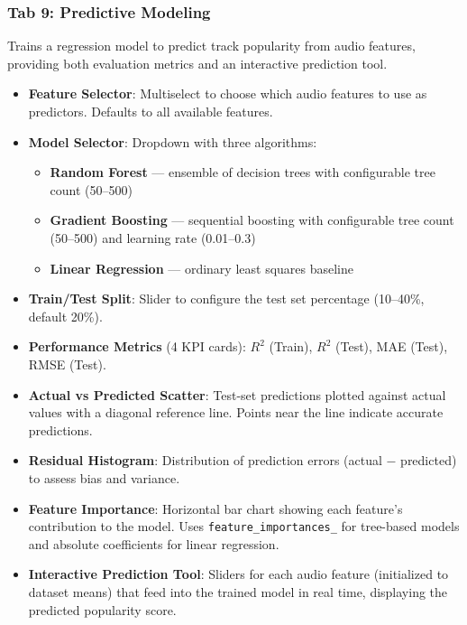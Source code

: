 \documentclass[12pt,a4paper]{article}
\begin{document}
\subsubsection{Tab 9: Predictive Modeling}

Trains a regression model to predict track popularity from audio features, providing both evaluation metrics and an interactive prediction tool.

\begin{itemize}[noitemsep]
    \item \textbf{Feature Selector}: Multiselect to choose which audio features to use as predictors. Defaults to all available features.
    \item \textbf{Model Selector}: Dropdown with three algorithms:
    \begin{itemize}[noitemsep]
        \item \textbf{Random Forest} --- ensemble of decision trees with configurable tree count (50--500)
        \item \textbf{Gradient Boosting} --- sequential boosting with configurable tree count (50--500) and learning rate (0.01--0.3)
        \item \textbf{Linear Regression} --- ordinary least squares baseline
    \end{itemize}
    \item \textbf{Train/Test Split}: Slider to configure the test set percentage (10--40\%, default 20\%).
    \item \textbf{Performance Metrics} (4 KPI cards): $R^2$ (Train), $R^2$ (Test), MAE (Test), RMSE (Test).
    \item \textbf{Actual vs Predicted Scatter}: Test-set predictions plotted against actual values with a diagonal reference line. Points near the line indicate accurate predictions.
    \item \textbf{Residual Histogram}: Distribution of prediction errors (actual $-$ predicted) to assess bias and variance.
    \item \textbf{Feature Importance}: Horizontal bar chart showing each feature's contribution to the model. Uses \texttt{feature\_importances\_} for tree-based models and absolute coefficients for linear regression.
    \item \textbf{Interactive Prediction Tool}: Sliders for each audio feature (initialized to dataset means) that feed into the trained model in real time, displaying the predicted popularity score.
\end{itemize}
\end{document}
